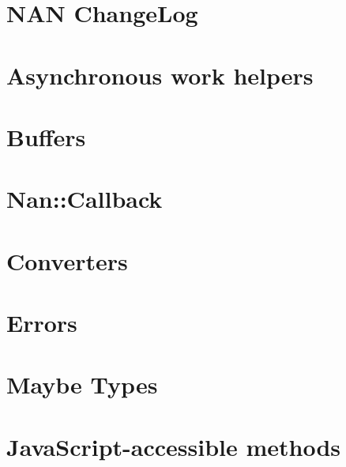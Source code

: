 \documentclass[twoside]{book}
\newcommand{\+}{\discretionary{\mbox{\scriptsize$\hookleftarrow$}}{}{}}
\begin{document}
\chapter{N\+AN Change\+Log}
\label{md_app_web_node_modules_nan__c_h_a_n_g_e_l_o_g}

\chapter{Asynchronous work helpers}
\label{md_app_web_node_modules_nan_doc_asyncworker}

\chapter{Buffers}
\label{md_app_web_node_modules_nan_doc_buffers}

\chapter{Nan\+:\+:Callback}
\label{md_app_web_node_modules_nan_doc_callback}

\chapter{Converters}
\label{md_app_web_node_modules_nan_doc_converters}

\chapter{Errors}
\label{md_app_web_node_modules_nan_doc_errors}

\chapter{Maybe Types}
\label{md_app_web_node_modules_nan_doc_maybe_types}

\chapter{Java\+Script-\/accessible methods}
\label{md_app_web_node_modules_nan_doc_methods}

\end{document}

